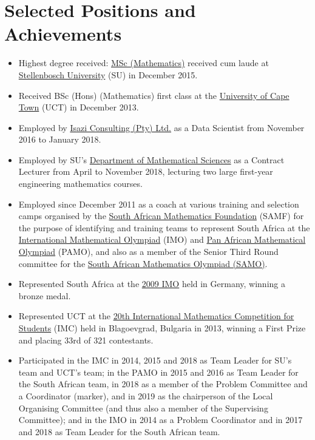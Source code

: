 \documentclass{article}
\begin{document}
\section{Selected Positions and Achievements} \begin{itemize}

  \item Highest degree received: \href{http://hdl.handle.net/10019.1/98017}{MSc (Mathematics)} received cum laude at \href{http://www.sun.ac.za}{Stellenbosch University} (SU) in December 2015.
  \item Received BSc (Hons) (Mathematics) first class at the \href{http://www.uct.ac.za}{University of Cape Town} (UCT) in December 2013.
  \item Employed by \href{http://www.isaziconsulting.co.za}{Isazi Consulting (Pty) Ltd.} as a Data Scientist from November 2016 to January 2018.
	\item Employed by SU's \href{http://www.sun.ac.za/english/faculty/science/Mathematics}{Department of Mathematical Sciences} as a Contract Lecturer from April to November 2018, lecturing two large first-year engineering mathematics courses.
  \item Employed since December 2011 as a coach at various training and selection camps organised by the \href{http://www.samf.ac.za/}{South African Mathematics Foundation} (SAMF) for the purpose of identifying and training teams  to represent South Africa at the \href{http://www.imo-official.org/}{International Mathematical Olympiad} (IMO) and \href{http://www.pamo-official.org/}{Pan African Mathematical Olympiad} (PAMO), and also as a member of the Senior Third Round committee for the \href{http://www.samf.ac.za/sa-mathematics-olympiad}{South African Mathematics Olympiad (SAMO)}.
  \item Represented South Africa at the \href{http://www.imo-official.org/year_info.aspx?year=2009}{2009 IMO} held in Germany, winning a bronze medal.
	\item Represented UCT at the \href{http://www.imc-math.org.uk/index.php?year=2013}{20th International Mathematics Competition for Students} (IMC) held in Blagoevgrad, Bulgaria in 2013, winning a First Prize and placing 33rd of 321 contestants.
	\item Participated in the IMC in 2014, 2015 and 2018 as Team Leader for SU's team and UCT's team; in the PAMO in 2015 and 2016 as Team Leader for the South African team, in 2018 as a member of the Problem Committee and a Coordinator (marker), and in 2019 as the chairperson of the Local Organising Committee (and thus also a member of the Supervising Committee); and in the IMO in 2014 as a Problem Coordinator and in 2017 and 2018 as Team Leader for the South African team.

\end{itemize}
\end{document}
